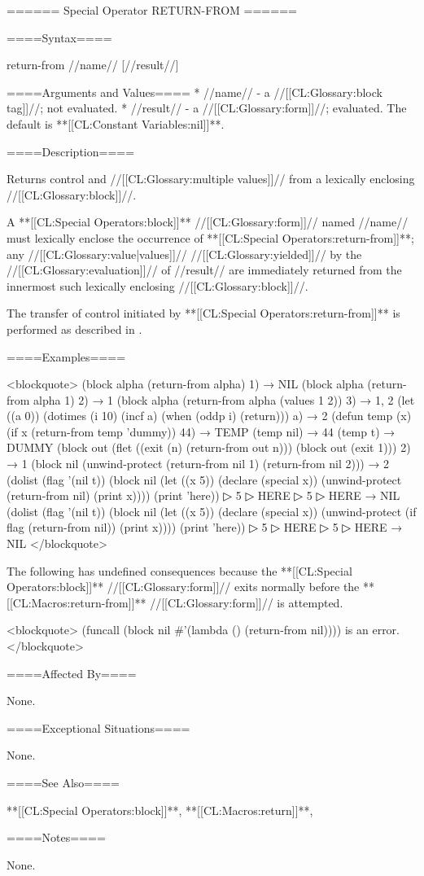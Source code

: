 ====== Special Operator RETURN-FROM ======

====Syntax====

\DefspecNoReturn return-from {//name// [//result//]}

====Arguments and Values====
  * //name// - a //[[CL:Glossary:block tag]]//; not evaluated.
  * //result// - a //[[CL:Glossary:form]]//; evaluated. The default is **[[CL:Constant Variables:nil]]**.

====Description====

Returns control and //[[CL:Glossary:multiple values]]// from a lexically enclosing //[[CL:Glossary:block]]//.

A **[[CL:Special Operators:block]]** //[[CL:Glossary:form]]// named //name// must lexically enclose the occurrence of **[[CL:Special Operators:return-from]]**; any //[[CL:Glossary:value|values]]// //[[CL:Glossary:yielded]]// by the //[[CL:Glossary:evaluation]]// of //result// are immediately returned from the innermost such lexically enclosing //[[CL:Glossary:block]]//.

The transfer of control initiated by **[[CL:Special Operators:return-from]]** is performed as described in \secref\TransferOfControl.

====Examples====

<blockquote> (block alpha (return-from alpha) 1) → NIL (block alpha (return-from alpha 1) 2) → 1 (block alpha (return-from alpha (values 1 2)) 3) → 1, 2 (let ((a 0)) (dotimes (i 10) (incf a) (when (oddp i) (return))) a) → 2 (defun temp (x) (if x (return-from temp 'dummy)) 44) → TEMP (temp nil) → 44 (temp t) → DUMMY (block out (flet ((exit (n) (return-from out n))) (block out (exit 1))) 2) → 1 (block nil (unwind-protect (return-from nil 1) (return-from nil 2))) → 2 (dolist (flag '(nil t)) (block nil (let ((x 5)) (declare (special x)) (unwind-protect (return-from nil) (print x)))) (print 'here))
▷ 5
▷ HERE
▷ 5
▷ HERE → NIL (dolist (flag '(nil t)) (block nil (let ((x 5)) (declare (special x)) (unwind-protect (if flag (return-from nil)) (print x)))) (print 'here))
▷ 5
▷ HERE
▷ 5
▷ HERE → NIL </blockquote>

The following has undefined consequences because the **[[CL:Special Operators:block]]** //[[CL:Glossary:form]]// exits normally before the **[[CL:Macros:return-from]]** //[[CL:Glossary:form]]// is attempted.

<blockquote> (funcall (block nil #'(lambda () (return-from nil)))) is an error. </blockquote>

====Affected By====

None.

====Exceptional Situations====

None.

====See Also====

**[[CL:Special Operators:block]]**, **[[CL:Macros:return]]**, {\secref\Evaluation}

====Notes====

None.

